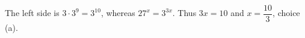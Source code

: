 The left side is $3\cdot3^9=3^{10}$, whereas $27^x=3^{3x}$. Thus $3x=10$ and $\boxed{x=\dfrac{10}{3}}$, choice (a).
